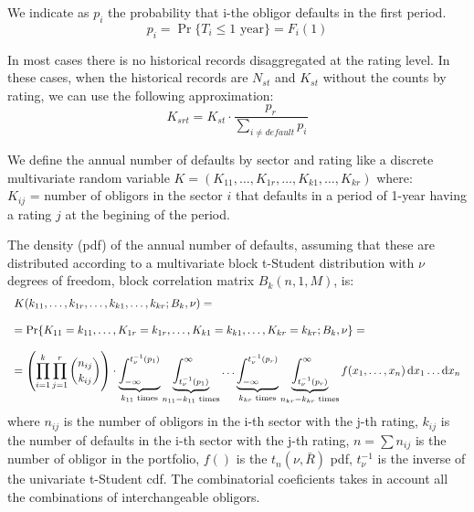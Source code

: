 \documentclass[11pt,fleqn]{book} %
\begin{document}
\begin{notation}
We indicate as $p_i$ the probability that i-the obligor defaults in 
the first period.
\begin{displaymath}
p_i = \Pr\{T_i \le 1 \text{ year}\} = F_i(1) 
\end{displaymath}
\end{notation}

In most cases there is no historical records disaggregated at the rating
level. In these cases, when the historical records are $N_{st}$ and 
$K_{st}$ without the counts by rating, we can use the following approximation:
\begin{displaymath}
K_{srt} = K_{st} \cdot \frac{p_r}{\displaystyle \sum_{i \ne default} p_i}
\end{displaymath}


\begin{definition}
We define the annual number of defaults by sector and rating like a
discrete multivariate random variable 
$K=(K_{11}, \dots, K_{1r}, \dots, K_{k1}, \dots, K_{kr})$ where:
\\
$K_{ij}$ = number of obligors in the sector $i$ that defaults in a
period of 1-year having a rating $j$ at the begining of the period.
\end{definition}

\begin{proposition}
The density (pdf) of the annual number of defaults, assuming that these
are distributed according to a multivariate block t-Student distribution
with $\nu$ degrees of freedom, block correlation matrix $B_k(n,1,M)$, is:
\begin{displaymath}
\begin{array}{l}
K(k_{11},\dots,k_{1r},\dots,k_{k1},\dots,k_{kr}; B_k,\nu) = \\
\\
= \Pr\{K_{11}=k_{11},\dots,K_{1r}=k_{1r},\dots,K_{k1}=k_{k1},\dots,K_{kr}=k_{kr}; B_k,\nu\} = \\
\\
= \left( \displaystyle \prod_{i=1}^k \prod_{j=1}^r \binom{n_{ij}}{k_{ij}} \right) \cdot
\displaystyle
\underbrace{\int_{-\infty}^{t_{\nu}^{-1}(p_1)}}_{k_{11} \text{ times}} 
\underbrace{\int_{t_{\nu}^{-1}(p_1)}^{\infty}}_{n_{11}-k_{11} \text{ times}}
\dots
\underbrace{\int_{-\infty}^{t_{\nu}^{-1}(p_r)}}_{k_{kr} \text{ times}}
\underbrace{\int_{t_{\nu}^{-1}(p_r)}^{\infty}}_{n_{kr}-k_{kr} \text{ times}}
f(x_1,\dots,x_n) \mathop{\mathrm{{}d}}\mathopen{} x_1 \dots \mathop{\mathrm{{}d}}\mathopen{} x_n
\end{array}
\end{displaymath}
where $n_{ij}$ is the number of obligors in the i-th sector with the 
j-th rating, $k_{ij}$ is the number of defaults in the i-th sector 
with the j-th rating, $n = \sum n_{ij}$ is the number of obligor in the
portfolio, $f()$ is the $t_n(\nu,\bar{R})$ pdf, $t_{\nu}^{-1}$ is the
inverse of the univariate t-Student cdf. The combinatorial coeficients
takes in account all the combinations of interchangeable obligors.
\end{proposition}
\end{document}
